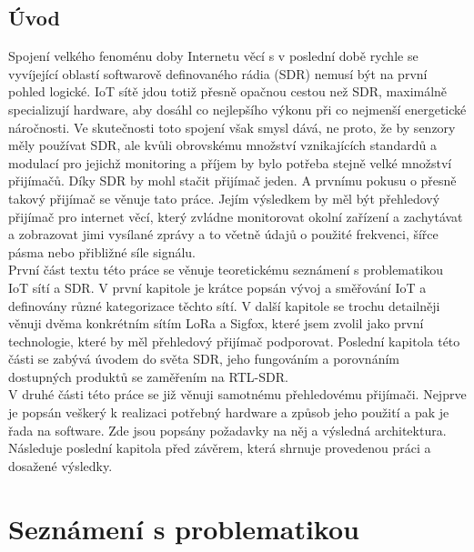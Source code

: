 \documentclass{ctuthesis}
\begin{document}
\maketitle

\chapter{Úvod}
Spojení velkého fenoménu doby Internetu věcí s v poslední době rychle se vyvíjející oblastí softwarově definovaného rádia (SDR) nemusí být na první pohled logické. IoT sítě jdou totiž přesně opačnou cestou než SDR, maximálně specializují hardware, aby dosáhl co nejlepšího výkonu při co nejmenší energetické náročnosti. Ve skutečnosti toto spojení však smysl dává, ne proto, že by senzory měly používat SDR, ale kvůli obrovskému množství vznikajících standardů a modulací pro jejichž monitoring a příjem by bylo potřeba stejně velké množství přijímačů. Díky SDR by mohl stačit přijímač jeden. A prvnímu pokusu o přesně takový přijímač se věnuje tato práce. Jejím výsledkem by měl být přehledový přijímač pro internet věcí, který zvládne monitorovat okolní zařízení a zachytávat a zobrazovat jimi vysílané zprávy a to včetně údajů o použité frekvenci, šířce pásma nebo přibližné síle signálu.\\
První část textu této práce se věnuje teoretickému seznámení s problematikou IoT sítí a SDR. V první kapitole je krátce popsán vývoj a směřování IoT a definovány různé kategorizace těchto sítí. V další kapitole se trochu detailněji věnuji dvěma konkrétním sítím LoRa a Sigfox, které jsem zvolil jako první technologie, které by měl přehledový přijímač podporovat. Poslední kapitola této části se zabývá úvodem do světa SDR, jeho fungováním a porovnáním dostupných produktů se zaměřením na RTL-SDR.\\
V druhé části této práce se již věnuji samotnému přehledovému přijímači. Nejprve je popsán veškerý k realizaci potřebný hardware a způsob jeho použití a pak je řada na software. Zde jsou popsány požadavky na něj a výsledná architektura. Následuje poslední kapitola před závěrem, která shrnuje provedenou práci a dosažené výsledky.

\part{Seznámení s problematikou}
\end{document}
